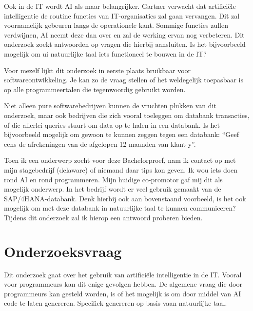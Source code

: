 Ook in de IT wordt AI als maar belangrijker. Gartner verwacht dat artificiële intelligentie de routine functies van IT-organisaties zal gaan vervangen. Dit zal voornamelijk  gebeuren langs de operationele kant. Sommige functies zullen verdwijnen, AI neemt deze dan over en zal de werking ervan nog verbeteren. Dit onderzoek zoekt antwoorden op vragen die hierbij aansluiten. Is het bijvoorbeeld mogelijk om ui natuurlijke taal iets functioneel te bouwen in de IT? 

Voor mezelf lijkt dit onderzoek in eerste plaats bruikbaar voor softwareontwikkeling. Je kan zo de vraag stellen of het weldegelijk toepasbaar is op alle programmeertalen die tegenwoordig gebruikt worden. 

Niet alleen pure softwarebedrijven kunnen de vruchten plukken van dit onderzoek, maar ook bedrijven die zich vooral toeleggen om databank transacties, of die allerlei queries stuurt om data op te halen in een databank. Is het bijvoorbeeld mogelijk om gewoon te kunnen zeggen tegen een databank: “Geef eens de afrekeningen van de afgelopen 12 maanden van klant y”. 

Toen ik een onderwerp zocht voor deze Bachelorproef, nam ik contact op met mijn stagebedrijf (delaware) of niemand daar tips kon geven. Ik wou iets doen rond AI en rond programmeren. Mijn huidige co-promotor gaf mij dit als mogelijk onderwerp. In het bedrijf wordt er veel gebruik gemaakt van de SAP/4HANA-databank. Denk hierbij ook aan bovenstaand voorbeeld, is het ook mogelijk om met deze databank in natuurlijke taal te kunnen communiceren? Tijdens dit onderzoek zal ik hierop een antwoord proberen bieden.

\section{Onderzoeksvraag}
\label{sec:onderzoeksvraag}

Dit onderzoek gaat over het gebruik van artificiële intelligentie in de IT. Vooral voor programmeurs kan dit enige gevolgen hebben. De algemene vraag die door programmeurs kan gesteld worden, is of het mogelijk is om door middel van AI code te laten genereren. Specifiek genereren op basis vaan natuurlijke taal. 

